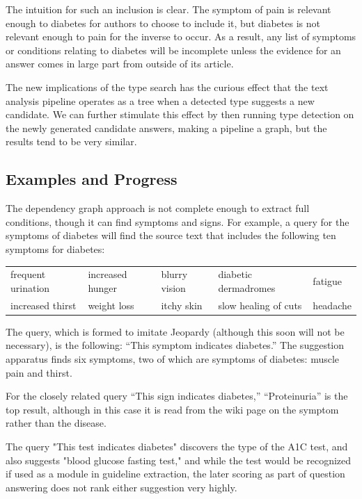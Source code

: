 \documentclass[12pt,letterpaper]{article}
\begin{document}
The intuition for such an inclusion is clear. The symptom of pain is relevant enough to diabetes for authors to choose to include it, but diabetes is not relevant enough to pain for the inverse to occur. As a result, any list of symptoms or conditions relating to diabetes will be incomplete unless the evidence for an answer comes in large part from outside of its article.

The new implications of the type search has the curious effect that the text analysis pipeline operates as a tree when a detected type suggests a new candidate. We can further stimulate this effect by then running type detection on the newly generated candidate answers, making a pipeline a graph, but the results tend to be very similar.

\subsection{Examples and Progress}
The dependency graph approach is not complete enough to extract full conditions, though it can find symptoms and signs. For example, a query for the symptoms of diabetes will find the source text that includes the following ten symptoms for diabetes:

\medskip
\begin{tabular}{lllll}
frequent urination & increased hunger & blurry vision & 
diabetic dermadromes & fatigue \\
increased thirst & weight loss & itchy skin & slow healing of cuts & headache  \\
\end{tabular}
\medskip

The query, which is formed to imitate Jeopardy (although this soon will not be necessary), is the following: ``This symptom indicates 
diabetes.'' The suggestion apparatus finds six symptoms, two of which are symptoms of diabetes: muscle pain and thirst.

For the closely related query ``This sign indicates diabetes,'' ``Proteinuria'' is the top result, although in this case it is read from the wiki page on the symptom rather than the disease.

The query "This test indicates diabetes" discovers the type of the A1C test, and also suggests "blood glucose fasting test," and while the test would be recognized if used as a module in guideline extraction, the later scoring as part of question answering does not rank either suggestion very highly.
\end{document}

